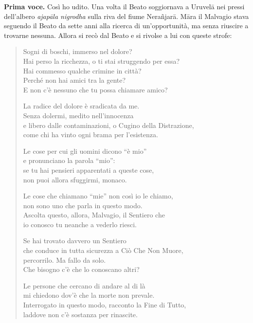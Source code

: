 \textbf{Prima voce.} Così ho udito. Una volta il Beato soggiornava a Uruvelā nei
pressi dell’albero \emph{ajapāla nigrodha} sulla riva del fiume Nerañjarā.
Māra il Malvagio stava seguendo il Beato da sette anni alla ricerca di
un’opportunità, ma senza riuscire a trovarne nessuna. Allora si recò dal
Beato e si rivolse a lui con queste strofe:


\begin{quotation}
Sogni di boschi, immerso nel dolore? \\
Hai perso la ricchezza, o ti stai struggendo per essa? \\
Hai commesso qualche crimine in città? \\
Perché non hai amici tra la gente? \\
E non c’è nessuno che tu possa chiamare amico?


La radice del dolore è sradicata da me. \\
Senza dolermi, medito nell’innocenza \\
e libero dalle contaminazioni, o Cugino della Distrazione, \\
come chi ha vinto ogni brama per l’esistenza.


Le cose per cui gli uomini dicono “è mio” \\
e pronunciano la parola “mio”: \\
se tu hai pensieri apparentati a queste cose, \\
non puoi allora sfuggirmi, monaco.


Le cose che chiamano “mie” non così io le chiamo, \\
non sono uno che parla in questo modo. \\
Ascolta questo, allora, Malvagio, il Sentiero che \\
io conosco tu neanche a vederlo riesci.


Se hai trovato davvero un Sentiero \\
che conduce in tutta sicurezza a Ciò Che Non Muore, \\
percorrilo. Ma fallo da solo. \\
Che bisogno c’è che lo conoscano altri?


Le persone che cercano di andare al di là \\
mi chiedono dov’è che la morte non prevale. \\
Interrogato in questo modo, racconto la Fine di Tutto, \\
laddove non c’è sostanza per rinascite.
\end{quotation}


